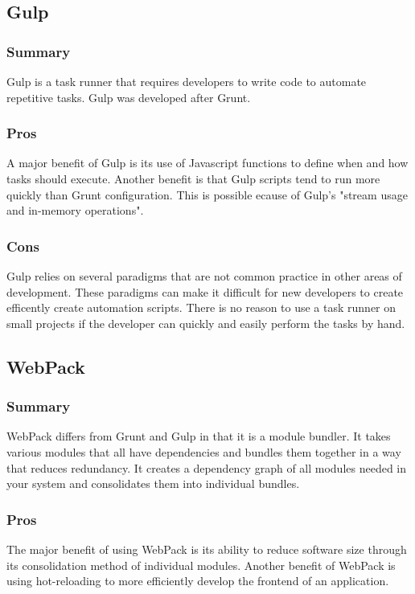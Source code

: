\documentclass[draftclsnofoot,onecolumn,letterpaper,10pt,compsoc]{IEEEtran}
\begin{document}
	\subsection{Gulp}
        \subsubsection{Summary}
            Gulp is a task runner that requires developers to write code to automate repetitive tasks\cite{TaskRunners}.
            Gulp was developed after Grunt.
            
        \subsubsection{Pros}
            A major benefit of Gulp is its use of Javascript functions to define when and how tasks should execute.
            Another benefit is that Gulp scripts tend to run more quickly than Grunt configuration\cite{GulpGruntSpeed}.
            This is possible ecause of Gulp's "stream usage and in-memory operations"\cite{TaskRunners}.
        
        \subsubsection{Cons}
            Gulp relies on several paradigms that are not common practice in other areas of development.
            These paradigms can make it difficult for new developers to create efficently create automation scripts.
            There is no reason to use a task runner on small projects if the developer can quickly and easily perform the tasks by hand.
    
	\subsection{WebPack}
        \subsubsection{Summary}
            WebPack differs from Grunt and Gulp in that it is a module bundler.
            It takes various modules that all have dependencies and bundles them together in a way that reduces redundancy\cite{WebPack}. 
            It creates a dependency graph of all modules needed in your system and consolidates them into individual bundles\cite{WebPack}.
        
        \subsubsection{Pros}
            The major benefit of using WebPack is its ability to reduce software size through its consolidation method of individual modules.
            Another benefit of WebPack is using hot-reloading to more efficiently develop the frontend of an application\cite{TaskRunners}.
        
\end{document}
